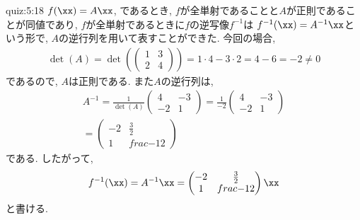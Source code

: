 \begin{answerof}{quiz:5:18}
  $f(\xx)=A\xx$, 
  であるとき,
  $f$が全単射であることと$A$が正則であることが同値であり,
  $f$が全単射であるときに$f$の逆写像$f^{-1}$は
  $f^{-1}(\xx)=A^{-1}\xx$という形で,
  $A$の逆行列を用いて表すことができた.
  今回の場合,
  \begin{align*}
    \det(A)=
    \det(\begin{pmatrix}1&3\\2&4\end{pmatrix})
      =1\cdot4-3\cdot 2=4-6=-2\neq 0
  \end{align*}
  であるので, $A$は正則である.
  また$A$の逆行列は,
  \begin{align*}
    A^{-1}=\frac{1}{\det(A)}
    \begin{pmatrix}4&-3\\-2&1\end{pmatrix}
      =\frac{1}{-2}\begin{pmatrix}4&-3\\-2&1\end{pmatrix}\\
      =\begin{pmatrix}-2&\frac{3}{2}\\1&frac{-1}{2}\end{pmatrix}
  \end{align*}
  である.
  したがって,
  \begin{align*}
    f^{-1}(\xx)=
    A^{-1}\xx
      =\begin{pmatrix}-2&\frac{3}{2}\\1&frac{-1}{2}\end{pmatrix}\xx
  \end{align*}
  と書ける.

\end{answerof}

